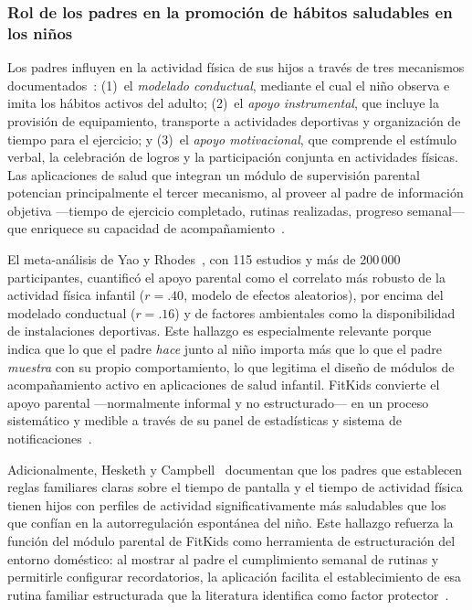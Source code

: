 				\subsubsection[Rol de los padres en los hábitos de los niños]{Rol de los padres en la promoción de hábitos saludables en los niños}
					Los padres influyen en la actividad física de sus hijos a través de tres mecanismos documentados~\cite{VegaDiaz2023}: (1)~el \textit{modelado conductual}, mediante el cual el niño observa e imita los hábitos activos del adulto; (2)~el \textit{apoyo instrumental}, que incluye la provisión de equipamiento, transporte a actividades deportivas y organización de tiempo para el ejercicio; y (3)~el \textit{apoyo motivacional}, que comprende el estímulo verbal, la celebración de logros y la participación conjunta en actividades físicas. Las aplicaciones de salud que integran un módulo de supervisión parental potencian principalmente el tercer mecanismo, al proveer al padre de información objetiva ---tiempo de ejercicio completado, rutinas realizadas, progreso semanal--- que enriquece su capacidad de acompañamiento~\cite{Yao2015}.
					
					El meta-análisis de Yao y Rhodes~\cite{Yao2015}, con 115 estudios y más de 200\,000 participantes, cuantificó el apoyo parental como el correlato más robusto de la actividad física infantil ($r = .40$, modelo de efectos aleatorios), por encima del modelado conductual ($r = .16$) y de factores ambientales como la disponibilidad de instalaciones deportivas. Este hallazgo es especialmente relevante porque indica que lo que el padre \textit{hace} junto al niño importa más que lo que el padre \textit{muestra} con su propio comportamiento, lo que legitima el diseño de módulos de acompañamiento activo en aplicaciones de salud infantil. FitKids convierte el apoyo parental ---normalmente informal y no estructurado--- en un proceso sistemático y medible a través de su panel de estadísticas y sistema de notificaciones~\cite{Yao2015}.
					
					Adicionalmente, Hesketh y Campbell~\cite{Hesketh2017} documentan que los padres que establecen reglas familiares claras sobre el tiempo de pantalla y el tiempo de actividad física tienen hijos con perfiles de actividad significativamente más saludables que los que confían en la autorregulación espontánea del niño. Este hallazgo refuerza la función del módulo parental de FitKids como herramienta de estructuración del entorno doméstico: al mostrar al padre el cumplimiento semanal de rutinas y permitirle configurar recordatorios, la aplicación facilita el establecimiento de esa rutina familiar estructurada que la literatura identifica como factor protector~\cite{Hesketh2017,VegaDiaz2023}.

